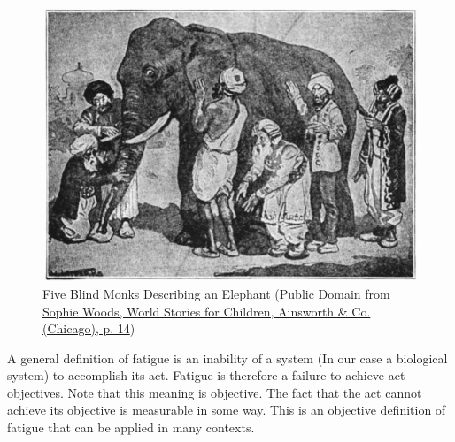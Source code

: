 \begin{figure}[!h]
    \centering
    \includegraphics[width=1\linewidth]{./figure/elephant.jpg}
    \caption{Five Blind Monks Describing an Elephant (\footnotesize{Public Domain from \href{https://commons.wikimedia.org/wiki/File:Blind_men_and_elephant.png}{Sophie Woods, World Stories for Children, Ainsworth & Co. (Chicago), p. 14}})}
    \label{fig:elephant}
\end{figure}

A general definition of fatigue is an inability of a system (In our case a biological system) to accomplish its act. Fatigue is therefore a failure to achieve act objectives. Note that this meaning is objective. The fact that the act cannot achieve its objective is measurable in some way. This is an objective definition of fatigue that can be applied in many contexts.

